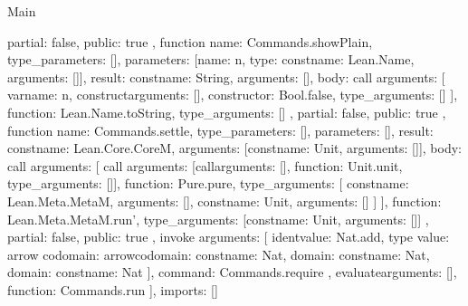 \begin{lexlean}{Main}
\begin{toolingmodule}
{{      partial: false,
      public: true
    },
    function{
      name: Commands.showPlain,
      type_parameters: [],
      parameters: [{name: n, type: const{name: Lean.Name, arguments: []}}],
      result: const{name: String, arguments: []},
      body: call{
        arguments: [
          var{name: n},
          construct{arguments: [], constructor: Bool.false, type_arguments: []}
        ],
        function: Lean.Name.toString,
        type_arguments: []
      },
      partial: false,
      public: true
    },
    function{
      name: Commands.settle,
      type_parameters: [],
      parameters: [],
      result: const{name: Lean.Core.CoreM, arguments: [const{name: Unit, arguments: []}]},
      body: call{
        arguments: [
          call{
            arguments: [call{arguments: [], function: Unit.unit, type_arguments: []}],
            function: Pure.pure,
            type_arguments: [
              const{name: Lean.Meta.MetaM, arguments: []},
              const{name: Unit, arguments: []}
            ]
          }
        ],
        function: Lean.Meta.MetaM.run',
        type_arguments: [const{name: Unit, arguments: []}]
      },
      partial: false,
      public: true
    },
    invoke{
      arguments: [
        ident{value: Nat.add},
        type{
          value: arrow{
            codomain: arrow{codomain: const{name: Nat}, domain: const{name: Nat}},
            domain: const{name: Nat}
          }
        }
      ],
      command: Commands.require
    },
    evaluate{arguments: [], function: Commands.run}
  ],
  imports: []
}
\end{toolingmodule}
\end{lexlean}
